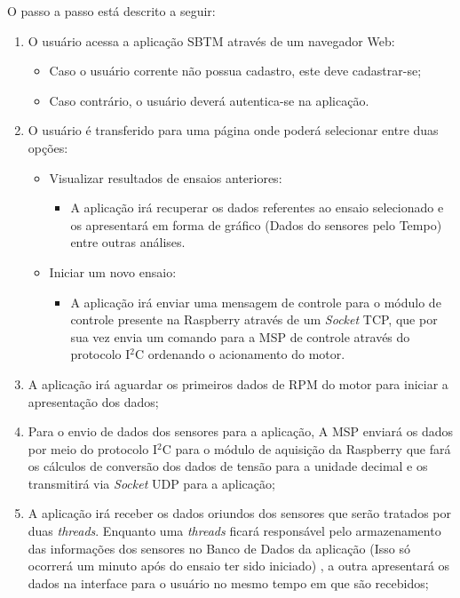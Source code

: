 O passo a passo está descrito a seguir:

\begin{enumerate}
	\item O usuário acessa a aplicação SBTM através de um navegador Web:
		\begin{itemize}
			\item Caso o usuário corrente não possua cadastro, este deve cadastrar-se;
			\item Caso contrário, o usuário deverá autentica-se na aplicação.
		\end{itemize}
	\item O usuário é transferido para uma página onde poderá selecionar entre duas opções:
		\begin{itemize}
			\item Visualizar resultados de ensaios anteriores:
				\begin{itemize}
					\item A aplicação irá recuperar os dados referentes ao ensaio selecionado e os apresentará em forma de gráfico (Dados do sensores pelo Tempo) entre outras análises.
				\end{itemize}
			\item Iniciar um novo ensaio:
			\begin{itemize}
				\item A aplicação irá enviar uma mensagem de controle para o módulo de controle presente na Raspberry através de um \textit{Socket} TCP, que por sua vez envia um comando para a MSP de controle através do protocolo I$^{2}$C ordenando o acionamento do motor.
			\end{itemize}
		\end{itemize}
	\item A aplicação irá aguardar os primeiros dados de RPM do motor para iniciar a apresentação dos dados;
	
	\item Para o envio de dados dos sensores para a aplicação, A MSP enviará os dados por meio do protocolo I$^{2}$C para o módulo de aquisição da Raspberry que fará os cálculos de conversão dos dados de tensão para a unidade decimal e os transmitirá via \textit{Socket} UDP para a aplicação;
	
	\item A aplicação irá receber os dados oriundos dos sensores que serão tratados por duas \textit{threads}. Enquanto uma \textit{threads} ficará responsável pelo armazenamento das informações dos sensores no Banco de Dados da aplicação (Isso só ocorrerá um minuto após do ensaio ter sido iniciado) , a outra apresentará os dados na interface para o usuário no mesmo tempo em que são recebidos;
	

\end{enumerate}
